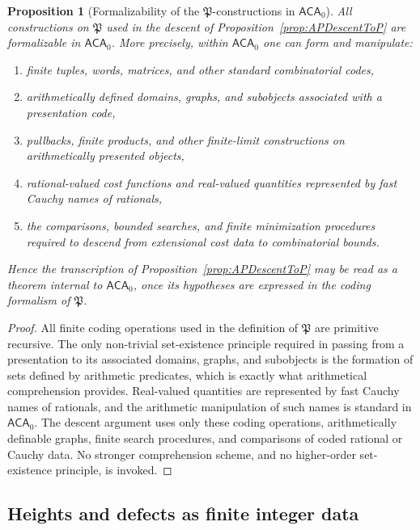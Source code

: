 \documentclass[10pt, reqno]{amsart}
\theoremstyle{plain}
\newtheorem{proposition}[theorem]{Proposition}
\theoremstyle{definition}
\theoremstyle{plain}
\begin{document}
\begin{proposition}[Formalizability of the $\mathfrak{P}$-constructions in \texorpdfstring{$\mathsf{ACA}_0$}{ACA0}]\label{prop:ACAFormalizable}
All constructions on $\mathfrak{P}$ used in the descent of Proposition~\ref{prop:APDescentToP} are formalizable in $\mathsf{ACA}_0$. More precisely, within $\mathsf{ACA}_0$ one can form and manipulate:
\begin{enumerate}
\item[(i)] finite tuples, words, matrices, and other standard combinatorial codes,
\item[(ii)] arithmetically defined domains, graphs, and subobjects associated with a presentation code,
\item[(iii)] pullbacks, finite products, and other finite-limit constructions on arithmetically presented objects,
\item[(iv)] rational-valued cost functions and real-valued quantities represented by fast Cauchy names of rationals,
\item[(v)] the comparisons, bounded searches, and finite minimization procedures required to descend from extensional cost data to combinatorial bounds.
\end{enumerate}
Hence the transcription of Proposition~\ref{prop:APDescentToP} may be read as a theorem internal to $\mathsf{ACA}_0$, once its hypotheses are expressed in the coding formalism of $\mathfrak{P}$.
\end{proposition}

\begin{proof}
All finite coding operations used in the definition of $\mathfrak{P}$ are primitive recursive. The only non-trivial set-existence principle required in passing from a presentation to its associated domains, graphs, and subobjects is the formation of sets defined by arithmetic predicates, which is exactly what arithmetical comprehension provides. Real-valued quantities are represented by fast Cauchy names of rationals, and the arithmetic manipulation of such names is standard in $\mathsf{ACA}_0$. The descent argument uses only these coding operations, arithmetically definable graphs, finite search procedures, and comparisons of coded rational or Cauchy data. No stronger comprehension scheme, and no higher-order set-existence principle, is invoked.
\end{proof}

\subsection{Heights and defects as finite integer data}\label{subsec:LogIntData}
\end{document}
